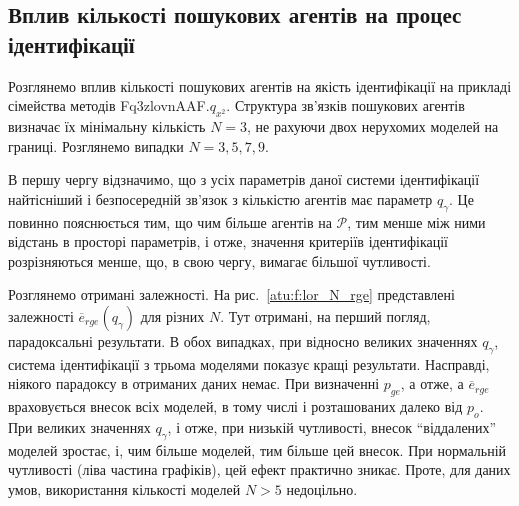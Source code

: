 


\subsection{Вплив кількості пошукових агентів на процес ідентифікації} %

Розглянемо вплив кількості пошукових агентів на якість
ідентифікації на прикладі сімейства методів
Fq3zlovnAAF.$q_{x^2}$.
Структура зв'язків пошукових агентів визначає їх мінімальну кількість
$ N = 3 $, не рахуючи двох нерухомих моделей на границі. Розглянемо
випадки $ N = 3,5,7,9 $.

В першу чергу відзначимо, що з усіх параметрів даної системи
ідентифікації найтісніший і безпосередній зв'язок з кількістю
агентів має параметр $ q_\gamma $.
Це повинно пояснюється тим, що чим більше агентів на
$ \mathcal{P} $, тим менше між ними відстань в просторі параметрів, і
отже, значення критеріїв ідентифікації розрізняються менше,
що, в свою чергу, вимагає більшої чутливості.

Розглянемо отримані залежності. На рис.~\ref{atu:f:lor_N_rge} представлені
залежності $ \overline{e}_{rge} (q_\gamma) $ для різних
$ N $. Тут отримані, на перший погляд, парадоксальні результати. В
обох випадках, при відносно великих значеннях
$ q_\gamma $, система ідентифікації з трьома моделями показує кращі
результати. Насправді, ніякого парадоксу в отриманих даних
немає. При визначенні
$ p_{ge} $, а отже, а
$ \overline{e}_{rge} $ враховується внесок всіх моделей, в тому числі і
розташованих далеко від
$ p_o $. При великих значеннях
$ q_\gamma $, і отже, при низькій чутливості, внесок ``віддалених''
моделей зростає, і, чим більше моделей, тим більше цей
внесок. При нормальній чутливості (ліва частина графіків), цей
ефект практично зникає. Проте, для даних умов, використання
кількості моделей
$ N> 5 $ недоцільно.



